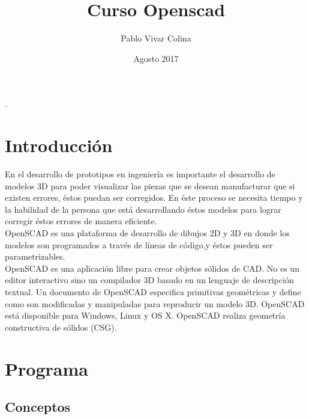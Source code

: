 \documentclass{article}
\title{Curso Openscad}
\author{Pablo Vivar Colina}
\date{Agosto 2017}
\begin{document}



\tableofcontents

.\\[3cm]

\section{Introducción}

En el desarrollo de prototipos en ingeniería es importante el desarrollo de modelos 3D para poder visualizar las piezas que se desean manufacturar que si existen errores, éstos puedan ser corregidos. En éste proceso se necesita tiempo y la habilidad de la persona que está desarrollando éstos modelos para lograr corregir éstos errores de manera eficiente.\\

OpenSCAD es una plataforma de desarrollo de dibujos 2D y 3D en donde los modelos son programados a través de líneas de código,y éstos pueden ser parametrizables.\\

OpenSCAD es una aplicación libre para crear objetos sólidos de CAD. No es un editor interactivo sino un compilador 3D basado en un lenguaje de descripción textual. Un documento de OpenSCAD especifica primitivas geométricas y define como son modificadas y manipuladas para reproducir un modelo 3D. OpenSCAD está disponible para Windows, Linux y OS X. OpenSCAD realiza geometría constructiva de sólidos (CSG).\citep{WikiOpensCAD}


\section{Programa}

\subsection{Conceptos}
\end{document}
